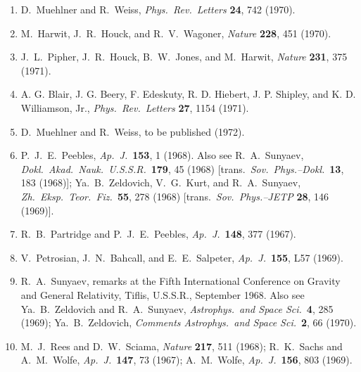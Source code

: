 \begin{enumerate}
  \item{}\label{ch15-ref-64}
  D.~Muehlner and R.~Weiss,
  \emph{Phys.\ Rev.\ Letters} \textbf{24}, 742 (1970).

  \item[64a.]\label{ch15-ref-64a}
  M.~Harwit, J.~R.~Houck, and R.~V.~Wagoner,
  \emph{Nature} \textbf{228}, 451 (1970).

  \item[64b.]\label{ch15-ref-64b}
  J.~L.~Pipher, J.~R.~Houck, B.~W.~Jones, and M.~Harwit,
  \emph{Nature} \textbf{231}, 375 (1971).

  \item[64c.]\label{ch15-ref-64c}
  A. G. Blair, J. G. Beery, F. Edeskuty, R. D. Hiebert, J. P. Shipley,
  and K. D. Williamson, Jr.,
  \emph{Phys.\ Rev.\ Letters} \textbf{27}, 1154 (1971).

  \item[64d.]\label{ch15-ref-64d}
  D.~Muehlner and R.~Weiss, to be published (1972).

  \item{}\label{ch15-ref-65}
  P.~J.~E.~Peebles, \emph{Ap.\ J.}\ \textbf{153}, 1 (1968).
  Also see R.~A.~Sunyaev,
  \emph{Dokl.\ Akad.\ Nauk.\ U.S.S.R.}\ \textbf{179}, 45 (1968)
  [trans.\ \emph{Sov.\ Phys.--Dokl.}\ \textbf{13}, 183 (1968)];
  Ya.~B.~Zeldovich, V.~G.~Kurt, and R.~A.~Sunyaev,
  \emph{Zh.\ Eksp.\ Teor.\ Fiz.}\ \textbf{55}, 278 (1968)
  [trans.\ \emph{Sov.\ Phys.--JETP} \textbf{28}, 146 (1969)].

  \item{}\label{ch15-ref-66}
  R.~B.~Partridge and P.~J.~E.~Peebles,
  \emph{Ap.\ J.}\ \textbf{148}, 377 (1967).

  \item{}\label{ch15-ref-67}
  V.~Petrosian, J.~N.~Bahcall, and E.~E.~Salpeter,
  \emph{Ap.\ J.}\ \textbf{155}, L57 (1969).

  \item{}\label{ch15-ref-68}
  R.~A.~Sunyaev, remarks at the Fifth International Conference on Gravity
  and General Relativity, Tiflis, U.S.S.R., September 1968.
  Also see Ya.~B.~Zeldovich and R.~A.~Sunyaev,
  \emph{Astrophys.\ and Space Sci.}\ \textbf{4}, 285 (1969);
  Ya.~B.~Zeldovich, \emph{Comments Astrophys.\ and Space Sci.}\
  \textbf{2}, 66 (1970).

  \item{}\label{ch15-ref-69}
  M.~J.~Rees and D.~W.~Sciama, \emph{Nature} \textbf{217}, 511 (1968);
  R.~K.~Sachs and A.~M.~Wolfe,
  \emph{Ap.\ J.}\ \textbf{147}, 73 (1967);
  A.~M.~Wolfe, \emph{Ap.\ J.}\ \textbf{156}, 803 (1969).


\end{enumerate}
